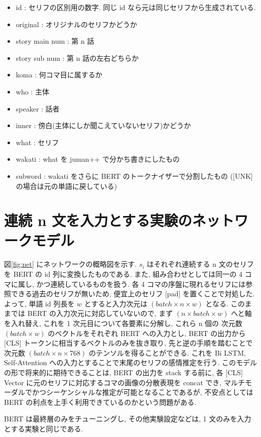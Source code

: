 \documentclass[twocolumn]{jarticle}     %
\begin{document}
\begin{itemize}
  \item id : セリフの区別用の数字. 同じ id なら元は同じセリフから生成されている.
  \item original : オリジナルのセリフかどうか
  \item story main num : 第 n 話
  \item story sub num : 第 n 話の左右どちらか
  \item koma : 何コマ目に属するか
  \item who : 主体
  \item speaker : 話者
  \item inner : 傍白(主体にしか聞こえていないセリフ)かどうか
  \item what : セリフ
  \item wakati : what を juman++ で分かち書きにしたもの
  \item subword : wakati をさらに BERT のトークナイザーで分割したもの ([UNK] の場合は元の単語に戻している)
\end{itemize}

\section{連続 n 文を入力とする実験のネットワークモデル}
図\ref{fig:net} にネットワークの概略図を示す. ${s_i}$ はそれぞれ連続する n 文のセリフを BERT の id 列に変換したものである. また, 組み合わせとしては同一の 4 コマに属し, かつ連続しているものを扱う. 各 4 コマの序盤に現れるセリフには参照できる過去のセリフが無いため, 便宜上のセリフ $[$pad$]$ を置くことで対処した. よって, 単語 id 列長を $w$ とすると入力次元は $(batch \times n \times w)$ となる. このままでは BERT の入力次元に対応していないので, まず $(n \times batch \times w)$ へと軸を入れ替え, これを 1 次元目について各要素に分解し, これら n 個の 次元数 $(batch \times w)$ のベクトルをそれぞれ BERT への入力とし, BERT の出力から [CLS] トークンに相当するベクトルのみを抜き取り, 先と逆の手順を踏むことで次元数 $(batch \times n \times 768)$ のテンソルを得ることができる. これを Bi LSTM, Self-Attention への入力とすることで末尾のセリフの感情推定を行う. このモデルの形で将来的に期待できることは, BERT の出力を stack する前に, 各 [CLS] Vector に元のセリフに対応するコマの画像の分散表現を concat でき, マルチモーダルでかつシーケンシャルな推定が可能となることであるが, 不安点としては BERT の利点を上手く利用できているのかという問題がある.

BERT は最終層のみをチューニングし, その他実験設定などは, 1 文のみを入力とする実験と同じである.
\end{document}
